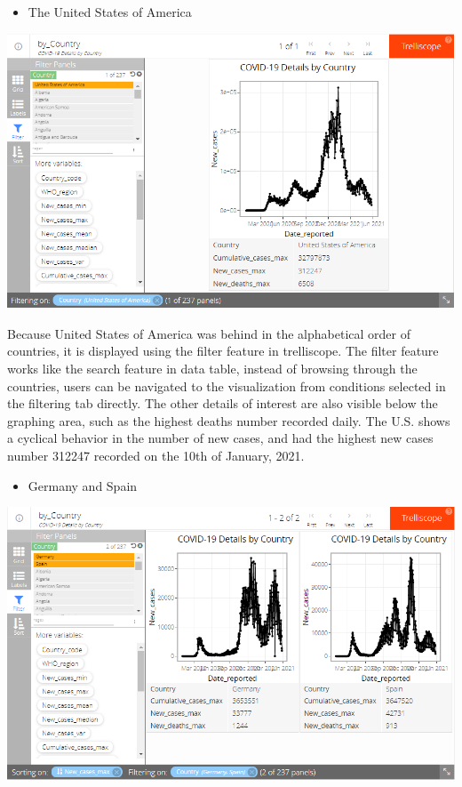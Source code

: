 \documentclass[
]{article}
\providecommand{\tightlist}{%
  \setlength{\itemsep}{0pt}\setlength{\parskip}{0pt}}
\begin{document}
\begin{itemize}
\tightlist
\item
  The United States of America
\end{itemize}

\includegraphics[width=1\linewidth,height=1\textheight]{UnitedStatesofAmerica}

Because United States of America was behind in the alphabetical order of
countries, it is displayed using the filter feature in trelliscope. The
filter feature works like the search feature in data table, instead of
browsing through the countries, users can be navigated to the
visualization from conditions selected in the filtering tab directly.
The other details of interest are also visible below the graphing area,
such as the highest deaths number recorded daily. The U.S. shows a
cyclical behavior in the number of new cases, and had the highest new
cases number 312247 recorded on the 10th of January, 2021.

\begin{itemize}
\tightlist
\item
  Germany and Spain
\end{itemize}

\includegraphics[width=1\linewidth,height=1\textheight]{GermanyvsSpain}
\end{document}
